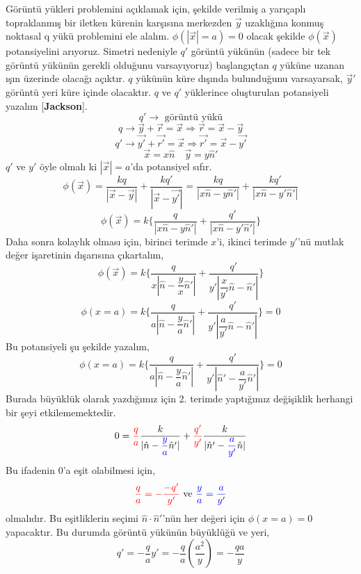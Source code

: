 \begin{theorem}
  Görüntü yükleri problemini açıklamak için, şekilde verilmiş a yarıçaplı topraklanmış bir iletken kürenin karşısına merkezden $\Vec{y}$ uzaklığına konmuş noktasal q yükü problemini ele alalım. $\phi (|\Vec{x}| = a) = 0 $ olacak şekilde $\phi (\Vec{x})$ potansiyelini arıyoruz. Simetri nedeniyle $q'$ görüntü yükünün (sadece bir tek görüntü yükünün gerekli olduğunu varsayıyoruz) başlangıçtan $q$ yüküne uzanan ışın üzerinde olacağı açıktır. $q$ yükünün küre dışında bulunduğunu varsayarsak, $\Vec{y}'$ görüntü yeri küre içinde olacaktır. $q$ ve $q'$ yüklerince oluşturulan potansiyeli yazalım [\textbf{Jackson}]. 
\[ q' \rightarrow \textrm{ görüntü yükü} \]
\[ q \rightarrow \Vec{y} + \Vec{r} = \Vec{x} \Rightarrow \Vec{r} = \Vec{x} - \Vec{y} \]
\[ q' \rightarrow \Vec{y'} + \Vec{r'} = \Vec{x} \Rightarrow \Vec{r'} = \Vec{x} - \Vec{y'} \]
\[ \Vec{x} = x \hat{n} \quad \Vec{y} = y \hat{n}' \]
$q'$ ve $y'$ öyle olmalı ki $|\Vec{x}| = a$'da potansiyel sıfır.
\[\phi (\Vec{x}) = \dfrac{kq}{|\Vec{x} - \Vec{y}|} + \dfrac{kq'}{|\Vec{x} - \Vec{y'}|} = \dfrac{kq}{|x \hat{n} - y \hat{n}'|} + \dfrac{kq'}{|x\hat{n} - y' \hat{n}'|} \tag{2.1}\]
\[\phi (\Vec{x})  = k \Big\{ \dfrac{q}{|x \hat{n} - y \hat{n}'|} + \dfrac{q'}{|x\hat{n} - y' \hat{n}'|} \Big\} \tag{2.2}\]
Daha sonra kolaylık olması için, birinci terimde $x$'i, ikinci terimde $y'$'nü mutlak değer işaretinin dışarısına çıkartalım,
\[\phi (\Vec{x})  = k \Bigg\{ \dfrac{q}{ x | \hat{n} - \dfrac{y}{x} \hat{n}'|} + \dfrac{q'}{ y' |\dfrac{x}{y'}\hat{n} - \hat{n}'|} \Bigg\} \]
\[\phi (x=a)  = k \Bigg\{ \dfrac{q}{ a | \hat{n} - \dfrac{y}{a} \hat{n}'|} + \dfrac{q'}{ y' |\dfrac{a}{y'}\hat{n} - \hat{n}'|} \Bigg\} = 0 \]
Bu potansiyeli şu şekilde yazalım,
\[\phi (x=a)  = k \Bigg\{ \dfrac{q}{ a | \hat{n} - \dfrac{y}{a} \hat{n}'|} + \dfrac{q'}{ y' |\hat{n}' - \dfrac{a}{y'}\hat{n}'|} \Bigg\} = 0 \tag{2.3}\]
Burada büyüklük olarak yazdığımız için 2. terimde yaptığımız değişiklik herhangi bir şeyi etkilememektedir.
\[ 0 = \begingroup \color{red} \dfrac{q}{a} \endgroup \dfrac{k}{  | \hat{n} - \begingroup \color{blue} \dfrac{y}{a} \endgroup \hat{n}'|} + \begingroup \color{red} \dfrac{q'}{y'} \endgroup \dfrac{k}{|  \hat{n}' -\begingroup \color{blue} \dfrac{a}{y'} \endgroup \hat{n}|} \]
Bu ifadenin $0$'a eşit olabilmesi için,
\[ \begingroup \color{red} \dfrac{q}{a} = - \dfrac{-q'}{y'} \endgroup \textrm{ ve }  \begingroup \color{blue} \dfrac{y}{a} = \dfrac{a}{y'}  \endgroup \]
olmalıdır. Bu eşitliklerin seçimi $\hat{n} \cdot \hat{n}'$'nün her değeri için $\phi (x=a) = 0$ yapacaktır. Bu durumda görüntü yükünün büyüklüğü ve yeri,
\[ q' = - \dfrac{q}{a} y' = - \dfrac{q}{a} (\dfrac{a^{2}}{y}) = - \dfrac{qa}{y} \]

\end{theorem}
